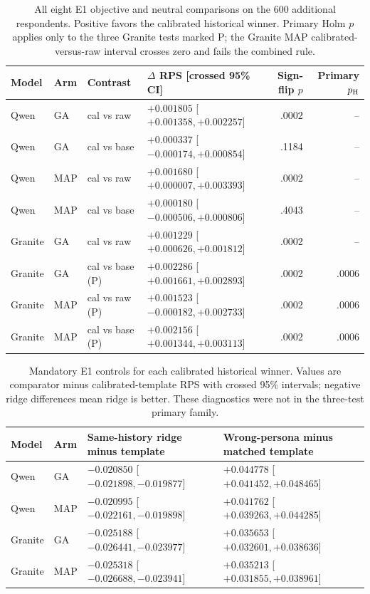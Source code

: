 \documentclass[sigconf,anonymous]{aamas}
\begin{document}
\begin{table}[H]\centering\scriptsize
\caption{All eight E1 objective and neutral comparisons on the 600 additional
respondents. Positive favors the calibrated historical winner. Primary Holm
$p$ applies only to the three Granite tests marked P; the Granite MAP
calibrated-versus-raw interval crosses zero and fails the combined rule.}
\label{tab:e1-contrasts}
\begin{tabular}{@{}llllrr@{}}\toprule
Model & Arm & Contrast & $\Delta$ RPS [crossed 95\% CI] & Sign-flip $p$ & Primary $p_{\rm H}$\\\midrule
Qwen & GA & cal vs raw & $+0.001805$ [$+0.001358,+0.002257$] & .0002 & --\\
Qwen & GA & cal vs base & $+0.000337$ [$-0.000174,+0.000854$] & .1184 & --\\
Qwen & MAP & cal vs raw & $+0.001680$ [$+0.000007,+0.003393$] & .0002 & --\\
Qwen & MAP & cal vs base & $+0.000180$ [$-0.000506,+0.000806$] & .4043 & --\\
Granite & GA & cal vs raw & $+0.001229$ [$+0.000626,+0.001812$] & .0002 & --\\
Granite & GA & cal vs base (P) & $+0.002286$ [$+0.001661,+0.002893$] & .0002 & .0006\\
Granite & MAP & cal vs raw (P) & $+0.001523$ [$-0.000182,+0.002733$] & .0002 & .0006\\
Granite & MAP & cal vs base (P) & $+0.002156$ [$+0.001344,+0.003113$] & .0002 & .0006\\\bottomrule
\end{tabular}\end{table}

\begin{table}[H]\centering\scriptsize
\caption{Mandatory E1 controls for each calibrated historical winner. Values
are comparator minus calibrated-template RPS with crossed 95\% intervals;
negative ridge differences mean ridge is better. These diagnostics were not
in the three-test primary family.}
\label{tab:e1-controls}
\begin{tabular}{@{}lll l@{}}\toprule
Model & Arm & Same-history ridge minus template & Wrong-persona minus matched template\\\midrule
Qwen & GA & $-0.020850$ [$-0.021898,-0.019877$] & $+0.044778$ [$+0.041452,+0.048465$]\\
Qwen & MAP & $-0.020995$ [$-0.022161,-0.019898$] & $+0.041762$ [$+0.039263,+0.044285$]\\
Granite & GA & $-0.025188$ [$-0.026441,-0.023977$] & $+0.035653$ [$+0.032601,+0.038636$]\\
Granite & MAP & $-0.025318$ [$-0.026688,-0.023941$] & $+0.035213$ [$+0.031855,+0.038961$]\\\bottomrule
\end{tabular}\end{table}
\end{document}
